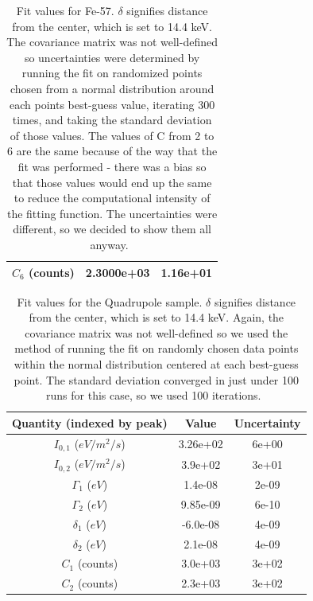 \documentclass[reprint, nobibnotes, amssymb, amsmath, amsfonts, mathtools, mathrsfs, floatfix]{revtex4-1}
\begin{document}
\begin{table}[h]
\begin{tabular}{|c|c|c|}
           $C_6$ (counts) & 2.3000e+03 & 1.16e+01 \\ \hline
        \end{tabular}
        \caption{Fit values for Fe-57.  $\delta$ signifies distance from the center, which is set to 14.4 keV.  The covariance matrix was not well-defined so uncertainties were determined by running the fit on randomized points chosen from a normal distribution around each points best-guess value, iterating 300 times, and taking the standard deviation of those values.  The values of C from 2 to 6 are the same because of the way that the fit was performed - there was a bias so that those values would end up the same to reduce the computational intensity of the fitting function.  The uncertainties were different, so we decided to show them all anyway.~\label{tab:fe_57_fit}}
      \end{table}

      \begin{table}[h]
        \begin{tabular}{|c|c|c|}
          \hline
          Quantity (indexed by peak) & Value & Uncertainty \\ \hline \hline
          $I_{0, 1}$ ($eV/m^2/s$) & 3.26e+02 & 6e+00 \\ \hline
          $I_{0, 2}$ ($eV/m^2/s$)& 3.9e+02 & 3e+01 \\ \hline \hline
          $\Gamma_1$ ($eV$) & 1.4e-08 & 2e-09 \\ \hline
          $\Gamma_2$ ($eV$) & 9.85e-09 & 6e-10 \\ \hline \hline
          $\delta_{1}$ ($eV$) & -6.0e-08 & 4e-09 \\ \hline
          $\delta_{2}$ ($eV$) & 2.1e-08 & 4e-09 \\ \hline \hline
          $C_1$ (counts) & 3.0e+03 & 3e+02 \\ \hline
          $C_2$ (counts) & 2.3e+03 & 3e+02 \\ \hline
        \end{tabular}
        \caption{Fit values for the Quadrupole sample.  $\delta$ signifies distance from the center, which is set to 14.4 keV.  Again, the covariance matrix was not well-defined so we used the method of running the fit on randomly chosen data points within the normal distribution centered at each best-guess point.  The standard deviation converged in just under 100 runs for this case, so we used 100 iterations.~\label{tab:quad_fit}}
      \end{table}
\end{document}
